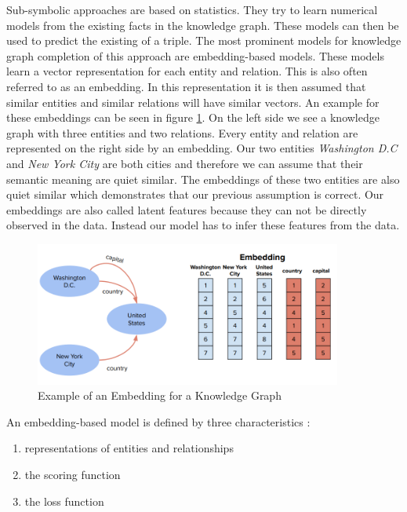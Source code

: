 Sub-symbolic approaches are based on statistics. They try to learn numerical models from the existing facts in the knowledge graph. These models can then be used to predict the existing of a triple.  \cite{nickel_review_2015} The most prominent models for knowledge graph completion of this approach are embedding-based models. These models learn a vector representation for each entity and relation. This is also often referred to as an embedding. In this representation it is then assumed that similar entities and similar relations will have similar vectors. An example for these embeddings can be seen in figure \ref{fig:embedding_example}. On the left side we see a knowledge graph with three entities and two relations. Every entity and relation are represented on the right side by an embedding. Our two entities \textit{Washington D.C} and \textit{New York City} are both cities and therefore we can assume that their semantic meaning are quiet similar. The embeddings of these two entities are also quiet similar which demonstrates that our previous assumption is correct. \cite{bianchi_knowledge_2020} Our embeddings are also called latent features because they can not be directly observed in the data. Instead our model has to infer these features from the data. \cite{nickel_review_2015} 

\begin{figure}[H]
\centering
\includegraphics[width=0.9\textwidth]{images/embedding_example.png}
\caption{Example of an Embedding for a Knowledge Graph}
\label{fig:embedding_example}
\end{figure}

An embedding-based model is defined by three characteristics \cite{bianchi_knowledge_2020}:

\begin{enumerate}
\item representations of entities and relationships
\item the scoring function
\item the loss function
\end{enumerate}

